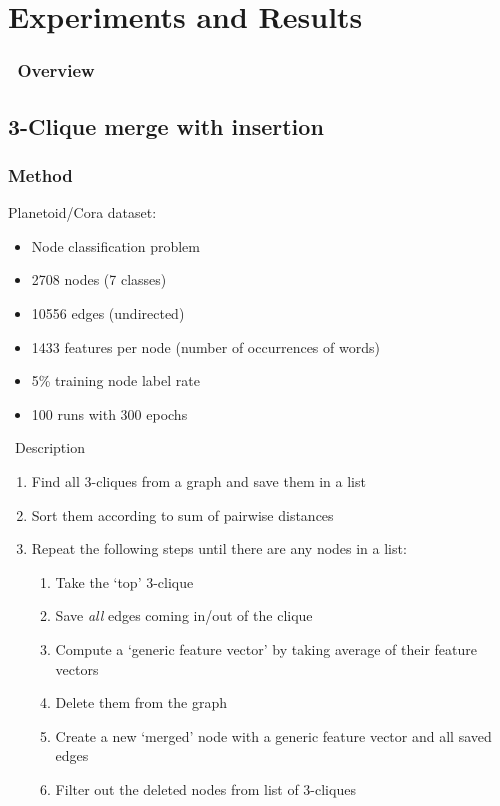 \section{Experiments and Results}

\begin{frame}
	\frametitle{\secname\ Overview}
	\tableofcontents[currentsection]
\end{frame}

\subsection{3-Clique merge with insertion}
\begin{frame}
	\frametitle{Method}
	Planetoid/Cora dataset:

	\begin{itemize}
		\item Node classification problem
		\item 2708 nodes (7 classes)
		\item 10556 edges (undirected)
		\item 1433 features per node (number of occurrences of words)
		\item 5\% training node label rate
		\item 100 runs with 300 epochs
	\end{itemize}
\end{frame}

\begin{frame}{\subsecname\ Description}
	\begin{enumerate}
		\item Find all 3-cliques from a graph and save them in a list
		\item Sort them according to sum of pairwise distances
		\item Repeat the following steps until there are any nodes in a list:
		      \begin{enumerate}
			      \item Take the `top' 3-clique
			      \item Save \emph{all} edges coming in/out of the clique
			      \item Compute a `generic feature vector' by taking average of their feature vectors
			      \item Delete them from the graph
			      \item Create a new `merged' node with a generic feature vector and all saved edges
			      \item Filter out the deleted nodes from list of 3-cliques
		      \end{enumerate}
	\end{enumerate}
\end{frame}

